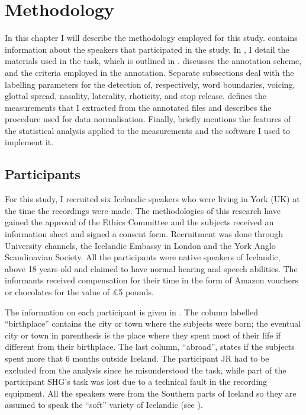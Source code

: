 \documentclass[11pt,a4paper,openany]{memoir}\usepackage[]{graphicx}\usepackage[]{color}
\begin{document}





\chapter{Methodology}
\label{c:methodology}
In this chapter I will describe the methodology employed for this study.
 contains information about the speakers that participated in the study.
In , I detail the materials used in the task, which is outlined in .
 discusses the annotation scheme, and the criteria employed in the annotation.
Separate subsections deal with the labelling parameters for the detection of, respectively, word boundaries, voicing, glottal spread, nasality, laterality, rhoticity, and stop release.
 defines the measurements that I extracted from the annotated files and describes the procedure used for data normalisation.
Finally,  briefly mentions the features of the statistical analysis applied to the measurements and the software I used to implement it.

\section{Participants}
\label{s:participants}

For this study, I recruited six Icelandic speakers who were living in York (UK) at the time the recordings were made.
The methodologies of this research have gained the approval of the Ethics Committee and the subjects received an information sheet and signed a consent form.
Recruitment was done through University channels, the Icelandic Embassy in London and the York Anglo Scandinavian Society.
All the participants were native speakers of Icelandic, above 18 years old and claimed to have normal hearing and speech abilities.
The informants received compensation for their time in the form of Amazon vouchers or chocolates for the value of £5 pounds.

The information on each participant is given in .
The column labelled ``birthplace'' contains the city or town where the subjects were born; the eventual city or town in parenthesis is the place where they spent most of their life if different from their birthplace.
The last column, ``abroad'', states if the subjects spent more that 6 months outside Iceland.
The participant JR had to be excluded from the analysis since he misunderstood the task, while part of the participant SHG's task was lost due to a technical fault in the recording equipment.
All the speakers were from the Southern parts of Iceland so they are assumed to speak the ``soft'' variety of Icelandic (see ).
\end{document}
